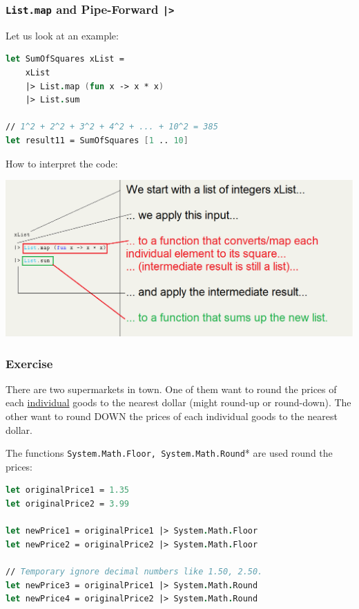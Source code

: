 \documentclass[12pt]{article}
\begin{document}
\subsubsection*{\texttt{List.map} and Pipe-Forward \texttt{|>}}
Let us look at an example:

\begin{lstlisting}[language=FSharp]
let SumOfSquares xList =
    xList
    |> List.map (fun x -> x * x)
    |> List.sum

// 1^2 + 2^2 + 3^2 + 4^2 + ... + 10^2 = 385
let result11 = SumOfSquares [1 .. 10]
\end{lstlisting}
How to interpret the code:
\begin{center}
\includegraphics[width=14cm]{pictures/picture29.png}
\end{center}

\pagebreak
\subsubsection*{Exercise}
There are two supermarkets in town. One of them want to round the prices of each \underline{individual} goods to the nearest dollar (might round-up or round-down). The other want to round DOWN the prices of each individual goods to the nearest dollar.

The functions \texttt{System.Math.Floor, System.Math.Round}* are used round the prices:
\begin{lstlisting}[language=FSharp]
let originalPrice1 = 1.35
let originalPrice2 = 3.99

let newPrice1 = originalPrice1 |> System.Math.Floor
let newPrice2 = originalPrice2 |> System.Math.Floor

// Temporary ignore decimal numbers like 1.50, 2.50.
let newPrice3 = originalPrice1 |> System.Math.Round
let newPrice4 = originalPrice2 |> System.Math.Round
\end{lstlisting}
\end{document}
